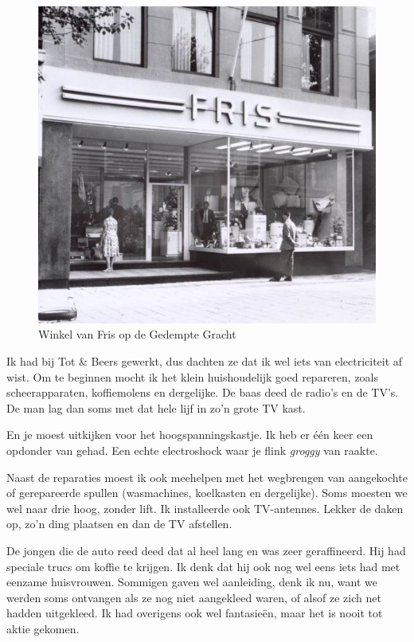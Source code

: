 \documentclass[12pt,twoside, openright]{memoir}
\begin{document}
\begin{figure}
\centering
\includegraphics[width=\textwidth]{img/200fris}
\caption*{\footnotesize Winkel van Fris op de Gedempte Gracht}
\end{figure}

Ik had bij Tot \& Beers gewerkt, dus dachten ze dat ik wel iets van electriciteit af wist. Om te beginnen mocht ik het klein huishoudelijk goed repareren, zoals scheerapparaten, koffiemolens en dergelijke. De baas deed de radio’s en de TV’s. De man lag dan soms met dat hele lijf in zo’n grote TV kast. 

En je moest uitkijken voor het hoogspanningskastje. Ik heb er één keer een opdonder van gehad. Een echte electroshock waar je flink \emph{groggy} van raakte.

Naast de reparaties moest ik ook meehelpen met het wegbrengen van aangekochte of gerepareerde spullen (wasmachines, koelkasten en dergelijke). Soms moesten we wel naar drie hoog, zonder lift. Ik installeerde ook TV-antennes. Lekker de daken op, zo’n ding plaatsen en dan de TV afstellen. 

De jongen die de auto reed deed dat al heel lang en was zeer geraffineerd. Hij had speciale trucs om koffie te krijgen. Ik denk dat hij ook nog wel eens iets had met eenzame huisvrouwen. Sommigen gaven wel aanleiding, denk ik nu, want we werden soms ontvangen als ze nog niet aangekleed waren, of alsof ze zich net hadden uitgekleed. Ik had overigens ook wel fantasieën, maar het is nooit tot aktie gekomen. 
\end{document}

